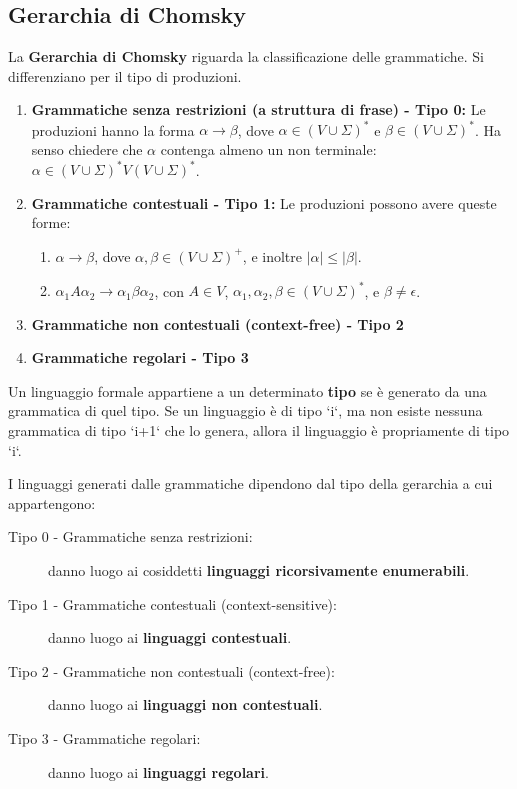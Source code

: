 \subsection{Gerarchia di Chomsky}

La \textbf{Gerarchia di Chomsky} riguarda la classificazione delle grammatiche. Si differenziano per il tipo di produzioni.

\begin{enumerate}
    \item \textbf{Grammatiche senza restrizioni (a struttura di frase) - Tipo 0:} Le produzioni hanno la forma $\alpha \rightarrow \beta$, dove $\alpha \in (V \cup \Sigma)^*$ e $\beta \in (V \cup \Sigma)^*$. Ha senso chiedere che $\alpha$ contenga almeno un non terminale: $\alpha \in (V \cup \Sigma)^* V (V \cup \Sigma)^*$.
    \item \textbf{Grammatiche contestuali - Tipo 1:} Le produzioni possono avere queste forme:
    \begin{enumerate}
        \item $\alpha \rightarrow \beta$, dove $\alpha, \beta \in (V \cup \Sigma)^+$, e inoltre $|\alpha| \le |\beta|$.
        \item $\alpha_1 A \alpha_2 \rightarrow \alpha_1 \beta \alpha_2$, con $A \in V$, $\alpha_1, \alpha_2, \beta \in (V \cup \Sigma)^*$, e $\beta \neq \epsilon$.
    \end{enumerate}
    \item \textbf{Grammatiche non contestuali (context-free) - Tipo 2}
    \item \textbf{Grammatiche regolari - Tipo 3}
\end{enumerate}



Un linguaggio formale appartiene a un determinato \textbf{tipo} se è generato da una grammatica di quel tipo. Se un linguaggio è di tipo `i`, ma non esiste nessuna grammatica di tipo `i+1` che lo genera, allora il linguaggio è propriamente di tipo `i`.

I linguaggi generati dalle grammatiche dipendono dal tipo della gerarchia a cui appartengono:

\begin{description}
    \item[Tipo 0 - Grammatiche senza restrizioni:] danno luogo ai cosiddetti \textbf{linguaggi ricorsivamente enumerabili}.
    \item[Tipo 1 - Grammatiche contestuali (context-sensitive):] danno luogo ai \textbf{linguaggi contestuali}.
    \item[Tipo 2 - Grammatiche non contestuali (context-free):] danno luogo ai \textbf{linguaggi non contestuali}.
    \item[Tipo 3 - Grammatiche regolari:] danno luogo ai \textbf{linguaggi regolari}.
\end{description}

